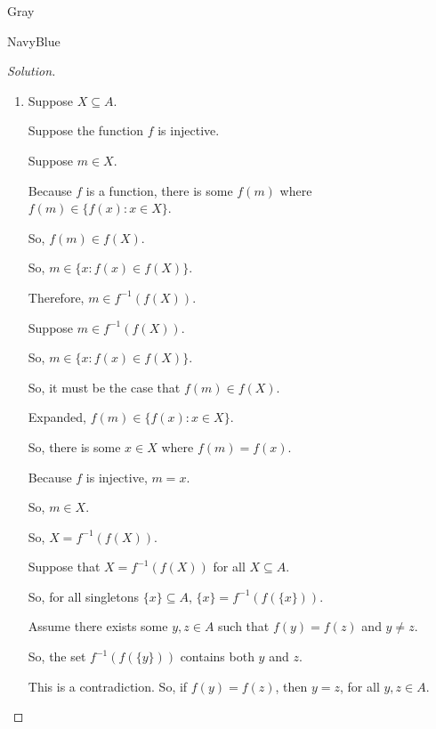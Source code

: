 \documentclass[12pt]{amsart}
\theoremstyle{named}
\newenvironment{soln}
{\begin{color}{Gray}\begin{framed}\begin{color}{NavyBlue}\begin{proof}[Solution]
\doublespacing}
{\end{proof}\end{color}\end{framed}\end{color}}
\theoremstyle{definition}
\begin{document}
\begin{soln}
	\phantom{ }
    
    \begin{enumerate}
        \item 
        \phantom{ }

        \noindent Suppose $X \subseteq A$.

        \noindent Suppose the function $f$ is injective.

        \begin{adjustwidth}{2em}{0em}
            \noindent Suppose $m \in X$.

            \noindent Because $f$ is a function, there is some $f(m)$ where $f(m) \in \{f(x) : x \in X\}$.

            \noindent So, $f(m) \in f(X)$.

            \noindent So, $m \in \{x : f(x) \in f(X)\}$.

            \noindent Therefore, $m \in f^{-1}(f(X))$. 

            \phantom{ }

            \noindent Suppose $m \in f^{-1}(f(X))$.

            \noindent So, $m \in \{ x : f(x) \in f(X)\}$.

            \noindent So, it must be the case that $f(m) \in f(X)$.

            \noindent Expanded, $f(m) \in \{f(x) : x \in X\}$.

            \noindent So, there is some $x \in X$ where $f(m) = f(x)$.

            \noindent Because $f$ is injective, $m = x$.

            \noindent So, $m \in X$. 
        \end{adjustwidth}

        \noindent So, $X = f^{-1}(f(X))$.

        \phantom{ }

        \noindent Suppose that $X = f^{-1}(f(X))$ for all $X \subseteq A$.

        \noindent So, for all singletons $\{x\} \subseteq A$, $\{x\} = f^{-1}(f(\{x\}))$.

        \noindent Assume there exists some $y,z \in A$ such that $f(y) = f(z)$ and $y \neq z$. 

        \noindent So, the set $f^{-1}(f(\{y\}))$ contains both $y$ and $z$. 

        \noindent This is a contradiction. So, if $f(y) = f(z)$, then $y = z$, for all $y,z \in A$.


\end{enumerate}
\end{soln}
\end{document}

